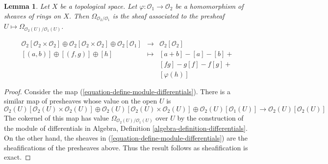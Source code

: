 \documentclass[10pt,a4paper]{amsart}
\theoremstyle{plain}
\newtheorem{lemma}[subsection]{Lemma}
\theoremstyle{definition}
\theoremstyle{remark}
\numberwithin{equation}{subsection}
\begin{document}
\begin{lemma}
\label{lemma-differentials-sheafify}
Let $X$ be a topological space. Let $\varphi : \mathcal{O}_1 \to \mathcal{O}_2$
be a homomorphism of sheaves of rings on $X$. Then
$\Omega_{\mathcal{O}_2/\mathcal{O}_1}$ is the sheaf associated to the
presheaf $U \mapsto \Omega_{\mathcal{O}_2(U)/\mathcal{O}_1(U)}$.
\end{lemma}

\begin{equation}
\label{equation-define-module-differentials}
\begin{matrix}
\mathcal{O}_2[\mathcal{O}_2 \times \mathcal{O}_2] \oplus
\mathcal{O}_2[\mathcal{O}_2 \times \mathcal{O}_2] \oplus
\mathcal{O}_2[\mathcal{O}_1] &
\longrightarrow &
\mathcal{O}_2[\mathcal{O}_2] \\
[(a, b)] \oplus [(f, g)] \oplus [h] & \longmapsto & [a + b] - [a] - [b] + \\
& & [fg] - g[f] - f[g] + \\
& & [\varphi(h)]
\end{matrix}
\end{equation}

\begin{proof}
Consider the map (\ref{equation-define-module-differentials}). There is
a similar map of presheaves whose value on the open $U$ is
$$
\mathcal{O}_2(U)[\mathcal{O}_2(U) \times \mathcal{O}_2(U)] \oplus
\mathcal{O}_2(U)[\mathcal{O}_2(U) \times \mathcal{O}_2(U)] \oplus
\mathcal{O}_2(U)[\mathcal{O}_1(U)]
\longrightarrow
\mathcal{O}_2(U)[\mathcal{O}_2(U)]
$$
The cokernel of this map has value $\Omega_{\mathcal{O}_2(U)/\mathcal{O}_1(U)}$
over $U$ by the construction of the module of differentials in 
Algebra, Definition \ref{algebra-definition-differentials}.
On the other hand, the sheaves in (\ref{equation-define-module-differentials})
are the sheafifications of the presheaves above. Thus the result follows
as sheafification is exact.
\end{proof}
\end{document}
